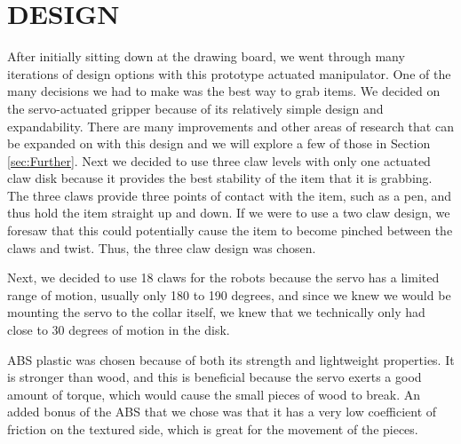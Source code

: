 \section{DESIGN}
\label{sec:Design}

After initially sitting down at the drawing board, we went through many iterations of design options with this prototype actuated manipulator. 
One of the many decisions we had to make was the best way to grab items. We decided on the servo-actuated gripper because of its relatively simple design and expandability.
There are many improvements and other areas of research that can be expanded on with this design and we will explore a few of those in Section \ref{sec:Further}. 
Next we decided to use three claw levels with only one actuated claw disk because it provides the best stability of the item that it is grabbing. The three claws provide three points of contact with the item, such as a pen, and thus hold the item straight up and down. 
If we were to use a two claw design, we foresaw that this could potentially cause the item to become pinched between the claws and twist. Thus, the three claw design was chosen. 

Next, we decided to use 18 claws for the robots because the servo has a limited range of motion, usually only 180 to 190 degrees, and since we knew we would be mounting the servo to the collar itself, we knew that we technically only had close to 30 degrees of motion in the disk. 

ABS plastic was chosen because of both its strength and lightweight properties. It is stronger than wood, and this is beneficial because the servo exerts a good amount of torque, which would cause the small pieces of wood to break. An added bonus of the ABS that we chose was that it has a very low coefficient of friction on the textured side, which is great for the movement of the pieces.

\begin{comment}
\begin{figure}[h]
\begin{center}
\texttt{[image: ./figs/]}
\end{center}
\caption{}
\label{fig:}
\end{figure}
\end{comment}